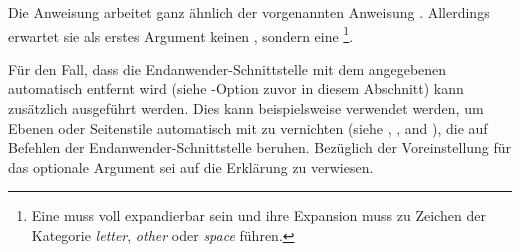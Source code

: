 Die Anweisung  arbeitet ganz ähnlich der
vorgenannten Anweisung . Allerdings erwartet sie
als erstes Argument keinen , sondern eine
\footnote{Eine  muss voll
  expandierbar sein und ihre Expansion muss zu Zeichen der Kategorie
  \emph{letter}, \emph{other} oder \emph{space} führen.}.%
%
\EndIndexGroup


\begin{Declaration}
\end{Declaration}
Für den Fall, dass die Endanwender-Schnittstelle mit dem angegebenen
 automatisch entfernt wird (siehe
\KOMAScript-Option  zuvor in
diesem Abschnitt) kann zusätzlich  ausgeführt werden. Dies kann
beispielsweise verwendet werden, um Ebenen oder Seitenstile automatisch mit zu
vernichten (siehe ,
, and
), die auf Befehlen der
Endanwender-Schnittstelle beruhen. Bezüglich der Voreinstellung für das
optionale Argument sei auf die Erklärung zu
 verwiesen.%
\EndIndexGroup
%
\EndIndexGroup





